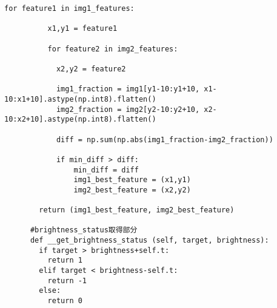 \begin{lstlisting}[caption=FAST]
        for feature1 in img1_features:
    
          x1,y1 = feature1
    
          for feature2 in img2_features:
    
            x2,y2 = feature2
    
            img1_fraction = img1[y1-10:y1+10, x1-10:x1+10].astype(np.int8).flatten()
            img2_fraction = img2[y2-10:y2+10, x2-10:x2+10].astype(np.int8).flatten()
    
            diff = np.sum(np.abs(img1_fraction-img2_fraction))
    
            if min_diff > diff:
                min_diff = diff
                img1_best_feature = (x1,y1)
                img2_best_feature = (x2,y2)
    
        return (img1_best_feature, img2_best_feature)
    
      #brightness_status取得部分
      def __get_brightness_status (self, target, brightness):
        if target > brightness+self.t:
          return 1
        elif target < brightness-self.t:
          return -1
        else:
          return 0
          
\end{lstlisting}
